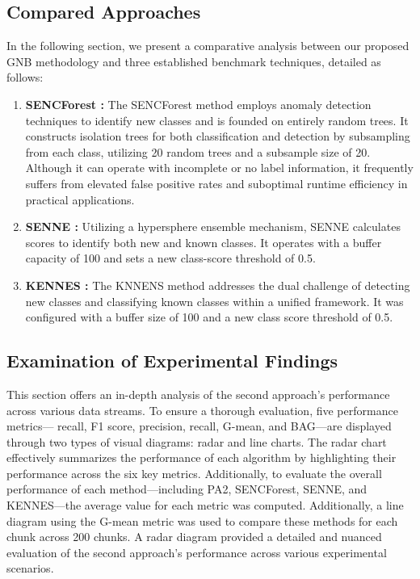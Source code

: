 \subsection{Compared Approaches}
\label{sec:compared_approaches}
In the following section, we present a comparative analysis between our proposed GNB methodology and three established benchmark techniques, detailed as follows:
\begin{enumerate}
	\item \textbf{SENCForest \cite{mu2017classification}:} The SENCForest method employs anomaly detection techniques to identify new classes and is founded on entirely random trees. It constructs isolation trees for both classification and detection by subsampling from each class, utilizing 20 random trees and a subsample size of 20. Although it can operate with incomplete or no label information, it frequently suffers from elevated false positive rates and suboptimal runtime efficiency in practical applications.
	\item \textbf{SENNE \cite{zhu2020semi}:} Utilizing a hypersphere ensemble mechanism, SENNE calculates scores to identify both new and known classes. It operates with a buffer capacity of 100 and sets a new class-score threshold of 0.5.
	\item \textbf{KENNES \cite{zhang2022knnens}:} The KNNENS method addresses the dual challenge of detecting new classes and classifying known classes within a unified framework. It was configured with a buffer size of 100 and a new class score threshold of 0.5.
\end{enumerate}



\subsection{Examination of Experimental Findings}
\label{sec:finding}
This section offers an in-depth analysis of the second approach's performance across various data streams. To ensure a thorough evaluation, five performance metrics— recall, F1 score, precision, recall, G-mean, and BAG—are displayed through two types of visual diagrams: radar and line charts. The radar chart effectively summarizes the performance of each algorithm by highlighting their performance across the six key metrics. Additionally, to evaluate the overall performance of each method—including PA2, SENCForest, SENNE, and KENNES—the average value for each metric was computed. Additionally, a line diagram using the G-mean metric was used to compare these methods for each chunk across 200 chunks. A radar diagram provided a detailed and nuanced evaluation of the second approach’s performance across various experimental scenarios.

